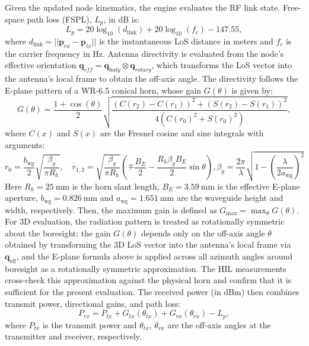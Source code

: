 \documentclass[fleqn,10pt]{wlscirep}
\newcommand{\rev}[1]{{\color{revblue}#1}}
\begin{document}
Given the updated node kinematics, the engine evaluates the RF link state. Free-space path loss (FSPL), $L_p$, in dB is:
\begin{equation}
    L_{p} = 20 \log_{10}(d_{\text{link}}) + 20 \log_{10}(f_c) - 147.55,
\end{equation}
where $d_{\text{link}} = ||\mathbf{p}_{rx} - \mathbf{p}_{tx}||$ is the instantaneous LoS distance in meters and $f_c$ is the carrier frequency in Hz. Antenna directivity is evaluated from the node's effective orientation $\mathbf{q}_{eff} = \mathbf{q}_{body} \otimes \mathbf{q}_{rotary}$, which transforms the LoS vector into the antenna's local frame to obtain the off-axis angle. The directivity follows the E-plane pattern of a WR-6.5 conical horn, whose gain $G(\theta)$ is given by:
\begin{equation}
    G(\theta) = \frac{1 + \cos(\theta)}{2} \sqrt{\frac{(C(r_2) - C(r_1))^2 + (S(r_2) - S(r_1))^2}{4(C(r_0)^2 + S(r_0)^2)}},
\end{equation}
where $C(x)$ and $S(x)$ are the Fresnel cosine and sine integrals with arguments:
\begin{equation}
    r_0 = \frac{b_\mathrm{wg}}{2}\sqrt{\frac{\beta_g}{\pi R_h}}, \quad
    r_{1,2} = \sqrt{\frac{\beta_g}{\pi R_h}}\left(\mp\frac{B_E}{2} - \frac{R_h \beta_g B_E}{2}\sin\theta\right),
    \beta_g = \frac{2\pi}{\lambda}\sqrt{1-\left(\frac{\lambda}{2a_\mathrm{wg}}\right)^2}
\end{equation}
Here $R_h = \SI{25}{\milli\meter}$ is the horn slant length, $B_E = \SI{3.59}{\milli\meter}$ is the effective E-plane aperture, $b_\mathrm{wg} = \SI{0.826}{\milli\meter}$ and $a_\mathrm{wg} = \SI{1.651}{\milli\meter}$ are the waveguide height and width, respectively. Then, the maximum gain is defined as $G_\mathrm{max} = \max_{\theta} G(\theta)$. \rev{For 3D evaluation, the radiation pattern is treated as rotationally symmetric about the boresight: the gain $G(\theta)$ depends only on the off-axis angle $\theta$ obtained by transforming the 3D LoS vector into the antenna's local frame via $\mathbf{q}_{\text{eff}}$, and the E-plane formula above is applied across all azimuth angles around boresight as a rotationally symmetric approximation. The HIL measurements cross-check this approximation against the physical horn and confirm that it is sufficient for the present evaluation.} The received power (in dBm) then combines transmit power, directional gains, and path loss:
\begin{equation}
P_{rx} = P_{tx} + G_{tx}(\theta_{tx}) + G_{rx}(\theta_{rx}) - L_p,
\end{equation}
where $P_{tx}$ is the transmit power and $\theta_{tx}$, $\theta_{rx}$ are the off-axis angles at the transmitter and receiver, respectively.
\end{document}

